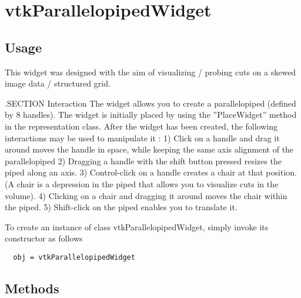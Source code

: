 \section{vtkParallelopipedWidget}

\subsection{Usage}

 This widget was designed with the aim of visualizing / probing cuts on
 a skewed image data / structured grid. 

 .SECTION Interaction
 The widget allows you to create a parallelopiped (defined by 8 handles).
 The widget is initially placed by using the ''PlaceWidget'' method in the
 representation class. After the widget has been created, the following
 interactions may be used to manipulate it :
 1) Click on a handle and drag it around moves the handle in space, while
    keeping the same axis alignment of the parallelopiped
 2) Dragging a handle with the shift button pressed resizes the piped
    along an axis.
 3) Control-click on a handle creates a chair at that position. (A chair
    is a depression in the piped that allows you to visualize cuts in the
    volume). 
 4) Clicking on a chair and dragging it around moves the chair within the
    piped.
 5) Shift-click on the piped enables you to translate it.


To create an instance of class vtkParallelopipedWidget, simply
invoke its constructor as follows
\begin{verbatim}
  obj = vtkParallelopipedWidget
\end{verbatim}
\subsection{Methods}

